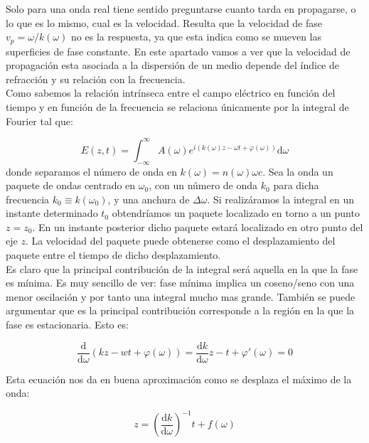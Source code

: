 \documentclass[12pt]{article}
\newcommand{\parentesis}[1]{\left( #1  \right)}
\newcommand{\D}{\mathrm{d}}
\numberwithin{equation}{section}
\numberwithin{figure}{section}
\begin{document}
Solo para una onda real tiene sentido preguntarse cuanto tarda en propagarse, o lo que es lo mismo, cual es la velocidad. Resulta que la velocidad de fase $v_p = \omega / k(\omega)$ no es la respuesta, ya que esta indica como se mueven las superficies de fase constante. En este apartado vamos a ver que la velocidad de propagación esta asociada a la dispersión de un medio depende del índice de refracción y su relación con la frecuencia. \\

Como sabemos la relación intrínseca entre el campo eléctrico en función del tiempo y en función de  la frecuencia se relaciona únicamente por la integral de Fourier tal que:

\begin{equation}
E(z,t) = \int_{-\infty}^{\infty} A(\omega) e^{i(k(\omega)z - \omega t + \varphi (\omega))} \D \omega
\end{equation}
donde separamos el número de onda en $k(\omega) = n(\omega) \omega c$. Sea la onda un paquete de ondas centrado en $\omega_0$, con un número de onda $k_0$ para dicha frecuencia $k_0 \equiv k(\omega_0)$, y una anchura de $\Delta \omega$. Si realizáramos la integral en un instante determinado $t_0$ obtendríamos un paquete localizado en torno a un punto $z=z_0$. En un instante posterior dicho paquete estará localizado en otro punto del eje $z$. La velocidad del paquete puede obtenerse como el desplazamiento del paquete entre el tiempo de dicho desplazamiento.  \\
 
Es claro que la principal contribución de la integral será aquella en la que la fase es mínima. Es muy sencillo de ver: fase mínima implica un coseno/seno con una menor oscilación y por tanto una integral mucho mas grande. También se puede argumentar que es la principal contribución corresponde a la región en la que la fase es estacionaria. Esto es:

\begin{equation}
\dfrac{\D}{\D \omega} \parentesis{kz - wt + \varphi (\omega)} = \dfrac{\D k}{\D \omega} z - t + \varphi'(\omega) = 0
\end{equation}

Esta ecuación nos da en buena aproximación como se desplaza el máximo de la onda:

\begin{equation}
z = \parentesis{\dfrac{\D k}{\D \omega}}^{-1} t + f(\omega)
\end{equation}
\end{document}
